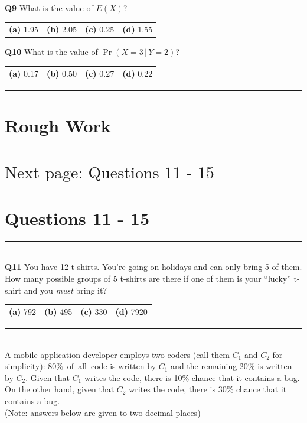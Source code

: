 \documentclass[12pt]{article}
\begin{document}
{\bf Q9} What is the value of $E(X)$?\\[0.2cm]
\begin{tabular}{cccc}
{\bf(a)} 1.95 & {\bf(b)} 2.05  & {\bf(c)} 0.25 & {\bf(d)} 1.55 \\[0.6cm]
\end{tabular}

{\bf Q10} What is the value of $\Pr(X=3\,|\,Y=2)$?\\[0.2cm]
\begin{tabular}{cccc}
{\bf(a)} 0.17 & {\bf(b)} 0.50 & {\bf(c)} 0.27 & {\bf(d)} 0.22 \\[0.6cm]
\end{tabular}

\rule{\linewidth}{1pt}

\newpage

\section*{Rough Work\\[23cm]}
\section*{\hspace{8cm}$\boxed{\text{Next page: Questions 11 - 15}}$}

\newpage

\section*{Questions 11 - 15}


\rule{\linewidth}{1pt}
\quad\\
{\bf Q11} You have 12 t-shirts. You're going on holidays and can only bring 5 of them. How many possible groups of 5 t-shirts are there if one of them is your ``lucky'' t-shirt and you \emph{must} bring it?\\[0.2cm]
\begin{tabular}{cccc}
{\bf(a)} 792 & {\bf(b)} 495 & {\bf(c)} 330 & {\bf(d)} 7920 \\[0.6cm]
\end{tabular}



\rule{\linewidth}{1pt}
\quad\\
A mobile application developer employs two coders (call them $C_1$ and $C_2$ for simplicity): \mbox{80\% of all code} is written by $C_1$ and the remaining 20\% is written by $C_2$. Given that $C_1$ writes the code, there is 10\% chance that it contains a bug. On the other hand, given that $C_2$ writes the code, there is 30\% chance that it contains a bug.\\{\footnotesize(Note: answers below are given to two decimal places)}\\[0.3cm]
\end{document}
